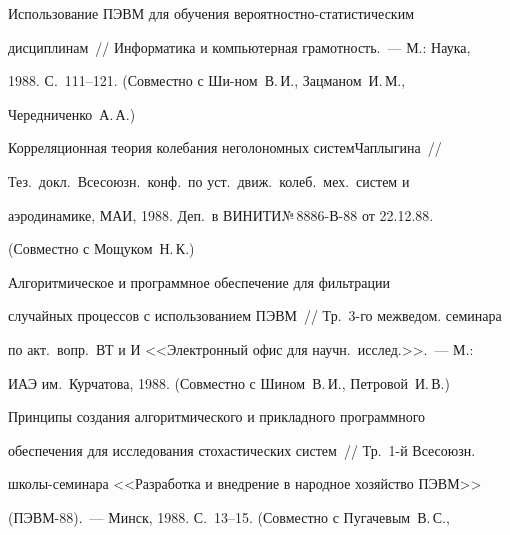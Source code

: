 

\vspace*{-3pt}





 Использование ПЭВМ для обучения вероятностно-ста\-ти\-сти\-че\-ским


дисциплинам~// Информатика и компьютерная грамотность.~--- М.: Наука,


1988. С.~111--121. (Совместно с Ши-\linebreak ном~В.\,И., Зацманом~И.\,М.,


Чередниченко~А.\,А.)


\vspace*{-1.2pt}





 Корреляционная теория колебания неголономных систем\linebreak Чап\-лы\-ги\-на~//


Тез.\ докл.\ Всесоюзн.\ конф.\ по уст.\ движ.\ колеб.\ мех.\ систем и


аэродинамике, МАИ, 1988. Деп.\ в ВИНИТИ\linebreak №\,8886-В-88 от 22.12.88.


(Совместно с Мощуком~Н.\,К.)


\vspace*{-1.2pt}





 Алгоритмическое и программное обеспечение для фильтрации


случайных процессов с использованием ПЭВМ~// Тр.\ 3-го межведом. семинара


по акт.\ вопр.\ ВТ и И <<Электронный офис для научн.\ исслед.>>.~--- М.:


ИАЭ им.~Курчатова, 1988. (Совместно с Шином~В.\,И., Петровой~И.\,В.)


\vspace*{-1.2pt}





 Принципы создания алгоритмического и прикладного программного


обеспечения для исследования стохастических систем~// Тр.\ 1-й Всесоюзн.\


шко\-лы-се\-ми\-на\-ра <<Разработка и внедрение в народное хозяйство ПЭВМ>>


(ПЭВМ-88).~--- Минск, 1988. С.~13--15. (Совместно с Пугачевым~В.\,С.,


